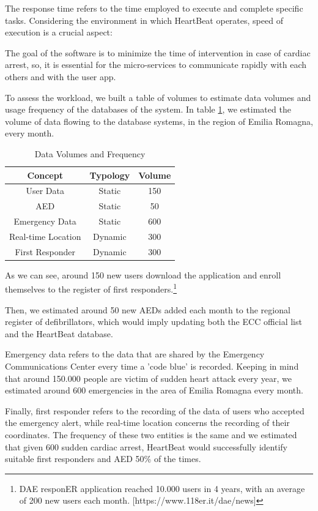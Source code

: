 \documentclass[11pt,a4paper]{article}
\begin{document}
The response time refers to the time employed to execute and complete specific tasks. 
%
Considering the environment in which HeartBeat operates, speed of execution is a crucial aspect:

The goal of the software is to minimize the time of intervention in case of cardiac arrest, so, it is essential for the micro-services to communicate rapidly with each others and with the user app.

To assess the workload, we built a table of volumes to estimate data volumes and usage frequency of the databases of the system.
%
In table \ref{table:volume}, we estimated the volume of data flowing to the database systems, in the region of Emilia Romagna, every month.

\begin{table}
\centering
\begin{tabular}{|c c c|} 
 \hline
 Concept & Typology & Volume \\ [0.5ex] 
 \hline\hline
 User Data & Static & 150 \\ 
 AED & Static & 50 \\
 Emergency Data & Static & 600 \\
 Real-time Location & Dynamic & 300 \\
 First Responder & Dynamic & 300 \\ [1ex] 
 \hline
\end{tabular}
\caption{Data Volumes and Frequency}
\label{table:volume}
\end{table}

As we can see, around 150 new users download the application and enroll themselves to the register of first responders.\footnote{DAE responER application reached 10.000 users  in 4 years, with an average of 200 new users each month. [https://www.118er.it/dae/news]}

Then, we estimated around 50 new AEDs added each month to the regional register of defibrillators, which would imply updating both the ECC official list and the HeartBeat database.

Emergency data refers to the data that are shared by the Emergency Communications Center every time a 'code blue' is recorded.
%
Keeping in mind that around 150.000 people are victim of sudden heart attack every year, we estimated around 600 emergencies in the area of Emilia Romagna every month.

Finally, first responder refers to the recording of the data of users who accepted the emergency alert, while real-time location concerns the recording of their coordinates.
%
The frequency of these two entities is the same and we estimated that given 600 sudden cardiac arrest, HeartBeat would successfully identify suitable first responders and AED 50\% of the times.
\end{document}
